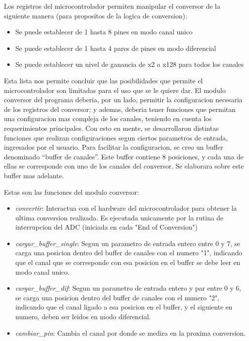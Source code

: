 Los registros del microcontrolador permiten manipular el conversor de la siguiente manera (para propositos de la logica de conversion):

\begin{itemize}
  \item Se puede establecer de 1 hasta 8 pines en modo canal unico
  \item Se puede establecer de 1 hasta 4 pares de pines en modo diferencial
  \item Se puede establecer un nivel de ganancia de x2 a x128 para todos los canales
\end{itemize}

Esta lista nos permite concluir que las posibilidades que permite el microcontrolador son limitadas para el uso que se le quiere dar. El modulo conversor del programa deberia, por un lado, permitir la configuracion necesaria de los registros del conversor; y ademas, deberia tener funciones que permitan una configuracion mas compleja de los canales, teniendo en cuenta los requerimientos principales.
Con esto en mente, se desarrollaron distintas funciones que realizan configuraciones segun ciertos parametros de entrada, ingresados por el usuario. Para facilitar la configuracion, se creo un buffer denominado ``buffer de canales''. Este buffer contiene 8 posiciones, y cada una de ellas se corresponde con uno de los canales del conversor. Se elaborara sobre este buffer mas adelante.

Estas son las funciones del modulo conversor:

\begin{itemize}
  \item \textit{convertir}: Interactua con el hardware del microcontrolador para obtener la ultima conversion realizada. Es ejecutada unicamente por la rutina de interrupcion del ADC (iniciada en cada "End of Conversion")
  \item \textit{cargar\_buffer\_single}: Segun un parametro de entrada entero entre 0 y 7, se carga una posicion dentro del buffer de canales con el numero "1", indicando que el canal que se corresponde con esa posicion en el buffer se debe leer en modo canal unico.
  \item \textit{cargar\_buffer\_dif}: Segun un parametro de entrada entero y par entre 0 y 6, se carga una posicion dentro del buffer de canales con el numero "2", indicando que el canal ligado a esa posicion en el buffer, y el siguiente en numero, deben ser leidos en modo diferencial.
  \item \textit{cambiar\_pin}: Cambia el canal por donde se medira en la proxima conversion.
\end{itemize}


